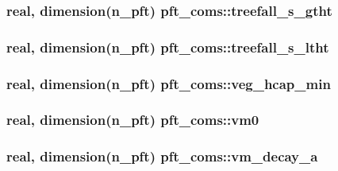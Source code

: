 \subsubsection[{treefall\+\_\+s\+\_\+gtht}]{\setlength{\rightskip}{0pt plus 5cm}real, dimension(n\+\_\+pft) pft\+\_\+coms\+::treefall\+\_\+s\+\_\+gtht}\label{namespacepft__coms_a0dde76d7d9a1502fb5b2095ac6ea30fb}
\hypertarget{namespacepft__coms_af905b11e7eb1e1a30875d6b583839e92}{}
\subsubsection[{treefall\+\_\+s\+\_\+ltht}]{\setlength{\rightskip}{0pt plus 5cm}real, dimension(n\+\_\+pft) pft\+\_\+coms\+::treefall\+\_\+s\+\_\+ltht}\label{namespacepft__coms_af905b11e7eb1e1a30875d6b583839e92}
\hypertarget{namespacepft__coms_a0bc569727ea7f49b70751189cb07d8fc}{}
\subsubsection[{veg\+\_\+hcap\+\_\+min}]{\setlength{\rightskip}{0pt plus 5cm}real, dimension(n\+\_\+pft) pft\+\_\+coms\+::veg\+\_\+hcap\+\_\+min}\label{namespacepft__coms_a0bc569727ea7f49b70751189cb07d8fc}
\hypertarget{namespacepft__coms_a80a6462c48a36d9c1ab7bcf0b6296702}{}
\subsubsection[{vm0}]{\setlength{\rightskip}{0pt plus 5cm}real, dimension(n\+\_\+pft) pft\+\_\+coms\+::vm0}\label{namespacepft__coms_a80a6462c48a36d9c1ab7bcf0b6296702}
\hypertarget{namespacepft__coms_a2c9cb0165d22f8653900869b77019f4d}{}
\subsubsection[{vm\+\_\+decay\+\_\+a}]{\setlength{\rightskip}{0pt plus 5cm}real, dimension(n\+\_\+pft) pft\+\_\+coms\+::vm\+\_\+decay\+\_\+a}\label{namespacepft__coms_a2c9cb0165d22f8653900869b77019f4d}
\hypertarget{namespacepft__coms_a21f9c00aea9610811aae2469b5070c1b}{}
